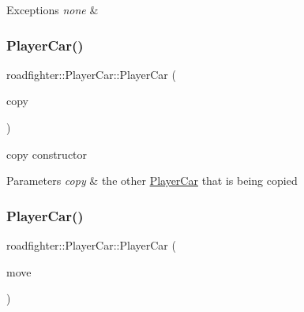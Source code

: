\begin{DoxyExceptions}{Exceptions}
{\em none} & \\
\hline
\end{DoxyExceptions}
\mbox{\label{classroadfighter_1_1PlayerCar_a89f593714201e6d8252abd19125c7c88}} 
\subsubsection{\texorpdfstring{Player\+Car()}{PlayerCar()}\hspace{0.1cm}{\footnotesize\ttfamily [3/5]}}
{\footnotesize\ttfamily roadfighter\+::\+Player\+Car\+::\+Player\+Car (\begin{DoxyParamCaption}\item[{const \hyperlink{classroadfighter_1_1PlayerCar}{Player\+Car} \&}]{copy }\end{DoxyParamCaption})\hspace{0.3cm}{\ttfamily [default]}}

copy constructor 
\begin{DoxyParams}{Parameters}
{\em copy} & the other \hyperlink{classroadfighter_1_1PlayerCar}{Player\+Car} that is being copied \\
\hline
\end{DoxyParams}
\mbox{\label{classroadfighter_1_1PlayerCar_a1243a4b2ec289c99884cb1c5f8a57531}} 
\subsubsection{\texorpdfstring{Player\+Car()}{PlayerCar()}\hspace{0.1cm}{\footnotesize\ttfamily [4/5]}}
{\footnotesize\ttfamily roadfighter\+::\+Player\+Car\+::\+Player\+Car (\begin{DoxyParamCaption}\item[{\hyperlink{classroadfighter_1_1PlayerCar}{Player\+Car} \&\&}]{move }\end{DoxyParamCaption})\hspace{0.3cm}{\ttfamily [default]}}

